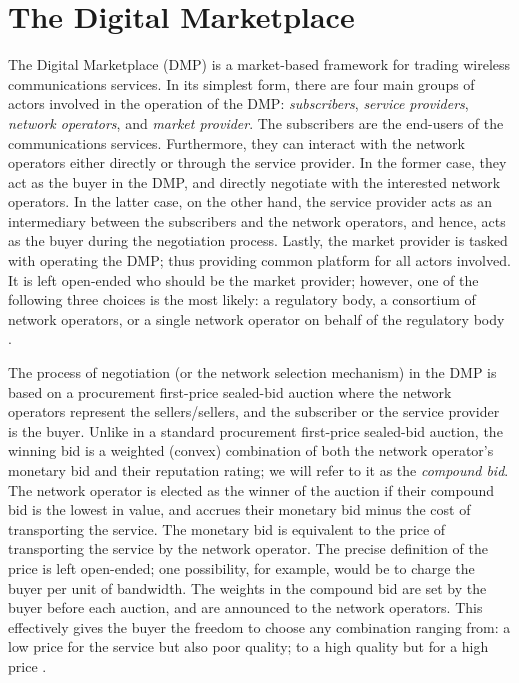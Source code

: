 \section{The Digital Marketplace} %
\label{sec:the_digital_marketplace_literature}
The Digital Marketplace (DMP) is a market-based framework for trading wireless communications services. In its simplest form, there are four main groups of actors involved in the operation of the DMP: \emph{subscribers}, \emph{service providers}, \emph{network operators}, and \emph{market provider}. The subscribers are the end-users of the communications services. Furthermore, they can interact with the network operators either directly or through the service provider. In the former case, they act as the buyer in the DMP, and directly negotiate with the interested network operators. In the latter case, on the other hand, the service provider acts as an intermediary between the subscribers and the network operators, and hence, acts as the buyer during the negotiation process. Lastly, the market provider is tasked with operating the DMP; thus providing common platform for all actors involved. It is left open-ended who should be the market provider; however, one of the following three choices is the most likely: a regulatory body, a consortium of network operators, or a single network operator on behalf of the regulatory body \cite{DMIrvine02}.

The process of negotiation (or the network selection mechanism) in the DMP is based on a procurement first-price sealed-bid auction where the network operators represent the sellers/sellers, and the subscriber or the service provider is the buyer. Unlike in a standard procurement first-price sealed-bid auction, the winning bid is a weighted (convex) combination of both the network operator's monetary bid and their reputation rating; we will refer to it as the \emph{compound bid}. The network operator is elected as the winner of the auction if their compound bid is the lowest in value, and accrues their monetary bid minus the cost of transporting the service. The monetary bid is equivalent to the price of transporting the service by the network operator. The precise definition of the price is left open-ended; one possibility, for example, would be to charge the buyer per unit of bandwidth. The weights in the compound bid are set by the buyer before each auction, and are announced to the network operators. This effectively gives the buyer the freedom to choose any combination ranging from: a low price for the service but also poor quality; to a high quality but for a high price \cite{DMLeBodic00}.


